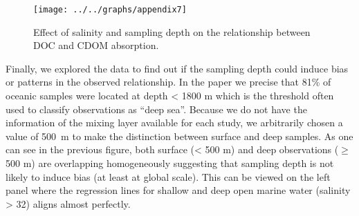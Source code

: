 \documentclass[12pt,a4paper]{scrartcl}
\begin{document}
\begin{figure}[H]
	\centering
	\texttt{[image: ../../graphs/appendix7]}
	\caption{Effect of salinity and sampling depth on the relationship between DOC and CDOM absorption.}
	\label{fig:salinity}
\end{figure}

Finally, we explored the data to find out if the sampling depth could induce bias or patterns in the observed relationship. In the paper we precise that 81\% of oceanic samples were located at depth < 1800 m  which is the threshold often used to classify observations as ``deep sea''. Because we do not have the information of the mixing layer available for each study, we arbitrarily chosen a value of 500~m to make the distinction between surface and deep samples. As one can see in the previous figure, both surface (< 500 m) and deep observations ($\ge$ 500 m) are overlapping homogeneously suggesting that sampling depth is not likely to induce bias (at least at global scale). This can be viewed on the left panel where the regression lines for shallow and deep open marine water (salinity > 32) aligns almost perfectly.
\end{document}
